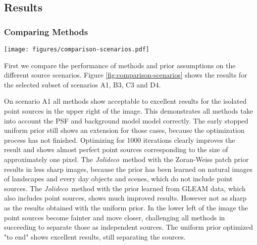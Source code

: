 \documentclass[twocolumn]{aastex631}
\DeclareMathOperator{\arcsinh}{arcsinh}
\newcommand{\jolideco}{\textit{Jolideco}~}
\begin{document}
    \subsection{Results}
    \subsubsection{Comparing Methods}
    \begin{figure*}
        \begin{centering}
            \texttt{[image: figures/comparison-scenarios.pdf]}
            \caption{
                Comparison of different deconvolution methods and prior assumptions for different selected source scenarios, as described in Section~\ref{subsec:test-datasets}. The simulation of the data for this figure used a fixed background level of $\lambda_{Bkg} = \qty[mode = math]{0.01}{cts/pix}$, a uniform exposure and a Gaussian PSF of width $\sigma_{PSF} = \qty[mode = math]{2}{pix}$, corresponding to the \enquote{Chandra} instrument scenario. The leftmost column shows the simulated counts data and the second most column from the left the underlying ground truth to compare. The other columns show the reconstructed flux by the different methods and prior assumptions for \jolideco. To enhance weak structures the images use an $\arcsinh$ stretching with a scale parameter of $a=0.02$. The stretching is the same for all images. The methods are described in detail in Section~\ref{subsec:methods}. A more detailed representation of the results is available at \url{https://jolideco.github.io/jolideco-comparison}.
            }
            \label{fig:comparison-scenarios}
        \end{centering}
    \end{figure*}
    First we compare the performance of methods and prior assumptions on the different source scenarios. Figure \ref{fig:comparison-scenarios} shows the results for the selected subset of scenarios A1, B3, C3 and D4. 
    
    On scenario A1 all methods show acceptable to excellent results for the isolated point sources in the upper right of the image. This demonstrates all methods take into account the PSF and background model model correctly. The early stopped uniform prior still shows an extension for those cases, because the optimization process has not finished. Optimizing for 1000 iterations clearly improves the result and shows almost perfect point sources corresponding to the size of approximately one pixel. The \jolideco method with the Zoran-Weiss patch prior results in less sharp images, because the prior has been learned on natural images of landscapes and every day objects and scenes, which do not include point sources. The \jolideco method with the prior learned from GLEAM data, which also includes point sources, shows much improved results. However not as sharp as the results obtained with the uniform prior. In the lower left of the image the point sources become fainter and move closer, challenging all methods in succeeding to separate those as independent sources. The uniform prior optimized "to end" shows excellent results, still separating the sources. 
    
\end{document}
